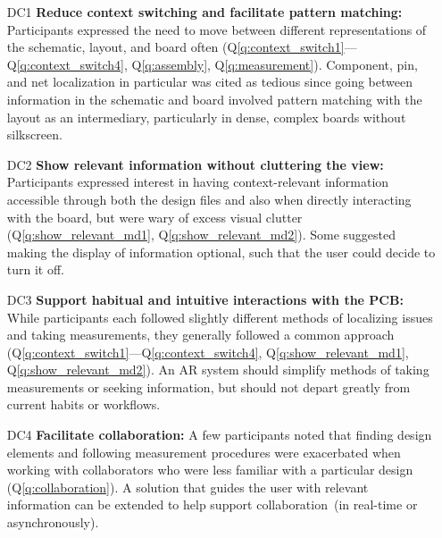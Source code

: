 \documentclass [11pt, proquest] {uwthesis}[2020/02/24]
\newcounter{sharc}
\newcommand{\sharcref}[1]{Q\ref{#1}} %
\begin{document}
\begin{itemize}
    \item [DC1] \textbf{Reduce context switching and facilitate pattern matching:} 
    Participants expressed the need to move between different representations of the schematic, layout, and board often (\sharcref{q:context_switch1}---\sharcref{q:context_switch4}, \sharcref{q:assembly}, \sharcref{q:measurement}). 
    Component, pin, and net localization in particular was cited as tedious since going between information in the schematic and board involved pattern matching with the layout as an intermediary, particularly in dense, complex boards without silkscreen.
    
    \item [DC2] \textbf{Show relevant information without cluttering the view:} 
    Participants expressed interest in having context-relevant information accessible through both the design files and also when directly interacting with the board, but were wary of excess visual clutter (\sharcref{q:show_relevant_md1}, \sharcref{q:show_relevant_md2}).
    Some suggested making the display of information optional, such that the user could decide to turn it off. 
    
    \item [DC3] \textbf{Support habitual and intuitive interactions with the PCB:} While participants each followed slightly different methods of localizing issues and taking measurements, they generally followed a common approach (\sharcref{q:context_switch1}---\sharcref{q:context_switch4}, \sharcref{q:show_relevant_md1}, \sharcref{q:show_relevant_md2}).
    An AR system should simplify methods of taking measurements or seeking information, but should not depart greatly from current habits or workflows.
    
    \item [DC4] \textbf{Facilitate collaboration:}
    A few participants noted that finding design elements and following measurement procedures were exacerbated when working with collaborators who were less familiar with a particular design (\sharcref{q:collaboration}).
    A solution that guides the user with relevant information can be extended to help support collaboration~(in real-time or asynchronously).
\end{itemize}
\end{document}
